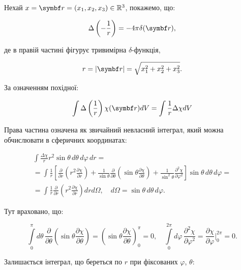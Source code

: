 Нехай  \( x = \vect{r} = (x_1, x_2, x_3) \in \mathbb{R}^3 \), покажемо, що:

\begin{equation}
\Delta \left( -\frac{1}{r} \right) = -4\pi \delta(\vect{r}),
\label{eq:laplace_fundamental}
\end{equation}

де в правій частині фігурує тривимірна \(\delta\)-функція,

\begin{equation*}
r = |\vect{r}| = \sqrt{x_1^2 + x_2^2 + x_3^2}.
\end{equation*}

За означенням похідної:

\begin{equation*}
\int \Delta \left( \frac{1}{r} \right) \chi(\vect{r}) dV = \int \frac{1}{r} \Delta \chi dV
\end{equation*}

Права частина означена як звичайний невласний інтеграл, який можна обчислювати в сферичних координатах:

\begin{multline*}
\int \frac{\Delta \chi}{r}  r^2 \sin \theta \, d\theta \, d\varphi \, dr = \\
=
\int \frac{1}{r} \left[ \frac{\partial}{\partial r} \left( r^2
\frac{\partial \chi}{\partial r} \right) + \frac{1}{\sin \theta} \frac{\partial}{\partial \theta} \left( \sin \theta \frac{\partial \chi}{\partial
\theta} \right) + \frac{1}{\sin^2 \theta} \frac{\partial^2 \chi}{\partial \varphi^2} \right] \sin \theta \, d\theta \, d\varphi =
\\=
\int \frac{1}{r}
\frac{\partial}{\partial r} \left( r^2 \frac{\partial \chi}{\partial r} \right) dr d\Omega, \quad d\Omega = \sin \theta \, d\theta \, d\varphi.
\end{multline*}

Тут враховано, що:

\begin{equation*}
\int\limits_0^\pi d\theta \, \frac{\partial}{\partial \theta} \left( \sin \theta \frac{\partial \chi}{\partial \theta} \right) = \left( \sin \theta
\frac{\partial \chi}{\partial \theta} \right)_0^\pi = 0, \quad \int\limits_0^{2\pi} d\varphi \, \frac{\partial^2 \chi}{\partial \varphi^2} =
\frac{\partial
\chi}{\partial \varphi} \bigg|_0^{2\pi} = 0.
\end{equation*}

Залишається інтеграл, що береться по \( r \) при фіксованих \( \varphi \), \( \theta \):

